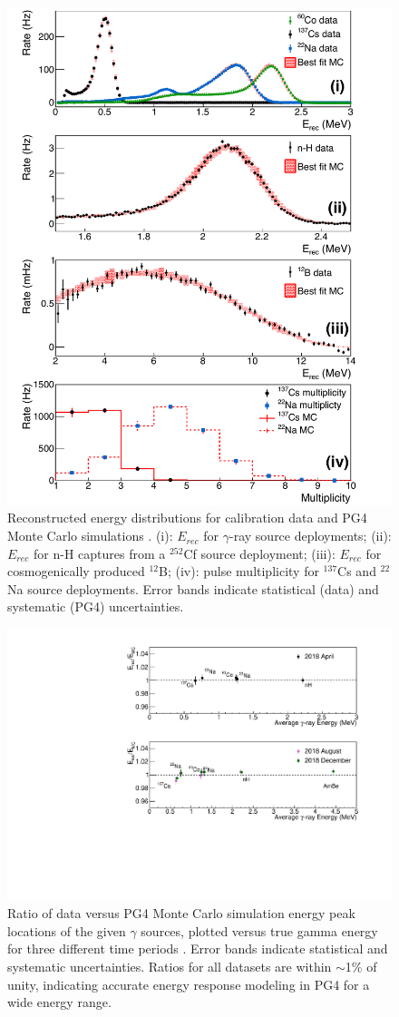 \begin{figure}[h]
	\centering
	\includegraphics[width=0.7\linewidth]{tex/5-analysis-images/GammaE}
	\caption[MC-data comparison of reconstructed energy]{Reconstructed energy distributions for calibration data and PG4 Monte Carlo simulations \cite{XZhang:2815}. (i): $E_{rec}$ for $\gamma$-ray source deployments; (ii): $E_{rec}$ for n-H captures from a $^{252}$Cf source deployment; (iii): $E_{rec}$ for cosmogenically produced $^{12}$B; (iv): pulse multiplicity for $^{137}$Cs and $^{22}$Na source deployments. Error bands indicate statistical (data) and systematic (PG4) uncertainties.}
	\label{fig:gammae}
\end{figure}

\begin{figure}[h]
	\centering
	\includegraphics[width=0.7\linewidth]{tex/5-analysis-images/GammaScale}
	\caption[MC-data reconstructed energy peak ratio for $\gamma$ sources]{Ratio of data versus PG4 Monte Carlo simulation energy peak locations of the given $\gamma$ sources, plotted versus true gamma energy for three different time periods \cite{XZhang:2815}. Error bands indicate statistical and systematic uncertainties. Ratios for all datasets are within $\sim$1\% of unity, indicating accurate energy response modeling in PG4 for a wide energy range.}
	\label{fig:gammascale}
\end{figure}

